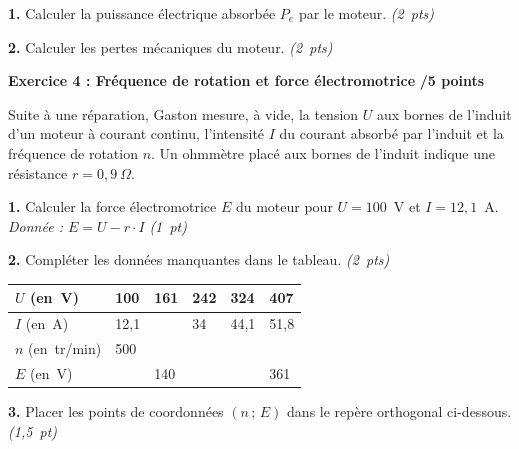 \documentclass[11pt,a4paper]{article}
\renewcommand{\arraystretch}{1.8}
\newcommand{\cadreblanc}[1]{%
	\medskip\framebox[\linewidth][c]{%
		\rule{0mm}{#1mm}}\par
	\medskip}
\begin{document}
\textbf{1.} Calculer la puissance électrique absorbée $P_e$ par le moteur. \hfill \textit{(2~pts)}

\cadreblanc{10}

\textbf{2.} Calculer les pertes mécaniques du moteur. \hfill \textit{(2~pts)}

\cadreblanc{20}

\vfill
\newpage

\textbf{Exercice 4 : Fréquence de rotation et force électromotrice}
\hfill \textbf{/5 points}

\vspace{4mm}

Suite à une réparation, Gaston mesure, à vide, la tension $U$ aux bornes de l'induit d'un moteur à courant continu, l'intensité $I$ du courant absorbé par l'induit et la fréquence de rotation $n$. Un ohmmètre placé aux bornes de l'induit indique une résistance $r = 0{,}9~\Omega$.

\vspace{4mm}

\textbf{1.} Calculer la force électromotrice $E$ du moteur pour $U = 100$~V et $I = 12{,}1$~A.
\hfill \textit{Donnée : $E = U - r \cdot I$} \hfill \textit{(1~pt)}

\cadreblanc{12}

\textbf{2.} Compléter les données manquantes dans le tableau. \hfill \textit{(2~pts)}

\vspace{3mm}

\begin{center}
	\renewcommand{\arraystretch}{2.2}
	\begin{tabular}{|l|m{2.2cm}|m{2.2cm}|m{2.2cm}|m{2.2cm}|m{2.2cm}|}
		\hline
		$U$ (en~V) & 100 & 161 & 242 & 324 & 407 \\
		\hline
		$I$ (en~A) & 12,1 & & 34 & 44,1 & 51,8 \\
		\hline
		$n$ (en~tr/min) & 500 & & & & \\
		\hline
		$E$ (en~V) & & 140 & & & 361 \\
		\hline
	\end{tabular}
\end{center}

\vspace{4mm}

\textbf{3.} Placer les points de coordonnées $(n\,;\,E)$ dans le repère orthogonal ci-dessous.
\hfill \textit{(1,5~pt)}

\vspace{4mm}
\end{document}
